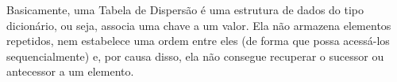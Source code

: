 \documentclass[12pt,openright,oneside,a4paper,english,brazil]{abntex2}
\begin{document}
\imprimircapa

Basicamente, uma Tabela de Dispersão é uma estrutura de dados do tipo dicionário, ou seja, associa uma chave a um valor. Ela não armazena elementos repetidos, nem estabelece uma ordem entre eles (de forma que possa acessá-los sequencialmente) e, por causa disso, ela não consegue recuperar o sucessor ou antecessor a um elemento.
\end{document}
